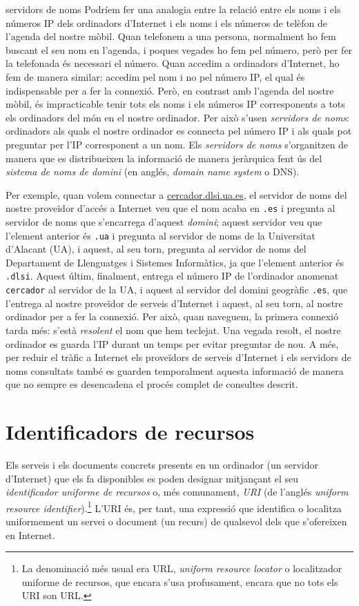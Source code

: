 \begin{persabermes}{servidors de noms}
  Podríem fer una analogia entre la relació entre els noms i els
  números IP dels ordinadors d'Internet i els noms i els números de
  telèfon de l'agenda del nostre mòbil. Quan telefonem a una persona,
  normalment ho fem buscant el seu nom en l'agenda, i poques vegades
  ho fem pel número, però per fer la telefonada és necessari el
  número. Quan accedim a ordinadors d'Internet, ho fem de manera
  similar: accedim pel nom i no pel número IP, el qual és
  indispensable per a fer la connexió. Però, en contrast amb l'agenda
  del nostre mòbil, és impracticable tenir tots els noms i els números
  IP corresponents a tots els ordinadors del món en el nostre
  ordinador. Per això s'usen \emph{servidors de noms}: ordinadors als
  quals el nostre ordinador es connecta pel número IP i als quals pot
  preguntar per l'IP corresponent a un nom. Els \emph{servidors de
    noms} s'organitzen de manera que es distribueixen la informació de
  manera jeràrquica fent ús del \emph{sistema de noms de domini} (en
  anglés, \emph{domain name system} o DNS). 

  Per exemple, quan volem connectar a \url{cercador.dlsi.ua.es}, el
  servidor de noms del nostre proveïdor d'accés a Internet veu que el
  nom acaba en \texttt{.es} i pregunta al servidor de noms que
  s'encarrega d'aquest \emph{domini}; aquest servidor veu que
  l'element anterior és \texttt{.ua} i pregunta al servidor de noms de
  la Universitat d'Alacant (UA), i aquest, al seu torn, pregunta al
  servidor de noms del Departament de Llenguatges i Sistemes
  Informàtics, ja que l'element anterior és \texttt{.dlsi}. Aquest
  últim, finalment, entrega el número IP de l'ordinador anomenat
  \texttt{cercador} al servidor de la UA, i aquest al servidor del
  domini geogràfic \texttt{.es}, que l'entrega al nostre proveïdor de
  serveis d'Internet i aquest, al seu torn, al nostre ordinador per a
  fer la connexió. Per això, quan naveguem, la primera connexió tarda
  més: s'està \emph{resolent} el nom que hem teclejat. Una vegada
  resolt, el nostre ordinador es guarda l'IP durant un temps per
  evitar preguntar de nou. A més, per reduir el tràfic a Internet els
  proveïdors de serveis d'Internet i els servidors de noms consultats
  també es guarden temporalment aquesta informació de manera que no
  sempre es desencadena el procés complet de consultes descrit.
\end{persabermes}

\section{Identificadors de recursos}
Els serveis i els documents concrets presents en un ordinador (un
servidor d'Internet) que els fa disponibles es poden designar
mitjançant el seu \emph{identificador uniforme de recursos} o, més
comunament, \emph{URI} (de l'anglés \emph{uniform resource
  identifier}).\footnote{La denominació més usual era URL,
  \emph{uniform resource locator} o localitzador uniforme de recursos,
  que encara s'usa profusament, encara que no tots els URI son URL.}
L'URI és, per tant, una expressió que identifica o localitza
uniformement un servei o document (un recurs) de qualsevol dels que
s'ofereixen en Internet.

